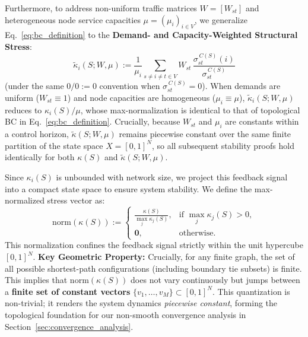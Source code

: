 \documentclass[journal]{IEEEtran}
\theoremstyle{plain}
\theoremstyle{definition}
\newcommand{\rev}[1]{{\color{blue}#1}}
\begin{document}
\rev{Furthermore, to address non-uniform traffic matrices $W = [W_{st}]$ and heterogeneous node service capacities $\mu = (\mu_i)_{i \in V}$, we generalize Eq.~\eqref{eq:bc_definition} to the \textbf{Demand- and Capacity-Weighted Structural Stress}:
\begin{equation}
    \label{eq:generalized_stress}
    \widetilde{\kappa}_i(S; W, \mu) := \frac{1}{\mu_i} \sum_{s\neq i\neq t\in V} W_{st}\,\frac{\sigma^{\,C(S)}_{st}(i)}{\sigma^{\,C(S)}_{st}}
\end{equation}
(under the same $0/0 := 0$ convention when $\sigma^{\,C(S)}_{st}=0$). When demands are uniform ($W_{st}\equiv 1$) and node capacities are homogeneous ($\mu_i \equiv \mu$), $\widetilde{\kappa}_i(S; W, \mu)$ reduces to $\kappa_i(S)/\mu$, whose max-normalization is identical to that of topological BC in Eq.~\eqref{eq:bc_definition}. Crucially, because $W_{st}$ and $\mu_i$ are constants within a control horizon, $\widetilde{\kappa}(S; W, \mu)$ remains piecewise constant over the same finite partition of the state space $X=[0,1]^N$, so all subsequent stability proofs hold identically for both $\kappa(S)$ and $\widetilde{\kappa}(S; W, \mu)$.}

Since $\kappa_i(S)$ is unbounded with network size, we project this feedback signal into a compact state space to ensure system stability. 
We define the max-normalized stress vector as:
\begin{equation}
    \label{eq:bc_normalization}
    \mathrm{norm}(\kappa(S)) :=
    \begin{cases}
    \displaystyle \frac{\kappa(S)}{\max_{j}\kappa_j(S)}, & \text{if } \max_j \kappa_j(S) > 0,\\[6pt]
    \mathbf{0}, & \text{otherwise.}
    \end{cases}
\end{equation}
This normalization confines the feedback signal strictly within the unit hypercube $[0,1]^N$. 
\textbf{Key Geometric Property:} Crucially, for any finite graph, the set of all possible shortest-path configurations (including boundary tie subsets) is finite. 
This implies that $\mathrm{norm}(\kappa(S))$ does not vary continuously but jumps between a \textbf{finite set of constant vectors} \rev{$\{v_1, \dots, v_M\} \subset [0,1]^N$}. 
This quantization is non-trivial; it renders the system dynamics \textit{piecewise constant}, forming the topological foundation for our non-smooth convergence analysis in Section~\ref{sec:convergence_analysis}.
\end{document}
